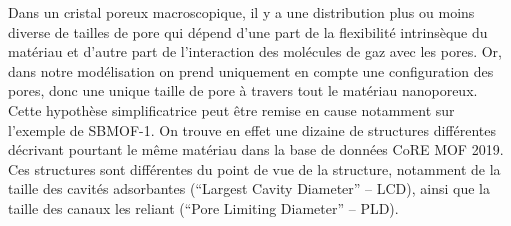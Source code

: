 \documentclass[main]{subfiles}
\begin{document}
Dans un cristal poreux macroscopique, il y a une distribution plus ou moins diverse de tailles de pore qui dépend d'une part de la flexibilité intrinsèque du matériau et d'autre part de l'interaction des molécules de gaz avec les pores. Or, dans notre modélisation on prend uniquement en compte une configuration des pores, donc une unique taille de pore à travers tout le matériau nanoporeux. Cette hypothèse simplificatrice peut être remise en cause notamment sur l'exemple de SBMOF-1. On trouve en effet une dizaine de structures différentes décrivant pourtant le même matériau dans la base de données CoRE MOF 2019. Ces structures sont différentes du point de vue de la structure, notamment de la taille des cavités adsorbantes (``Largest Cavity Diameter'' -- LCD), ainsi que la taille des canaux les reliant (``Pore Limiting Diameter'' -- PLD). 
\end{document}
